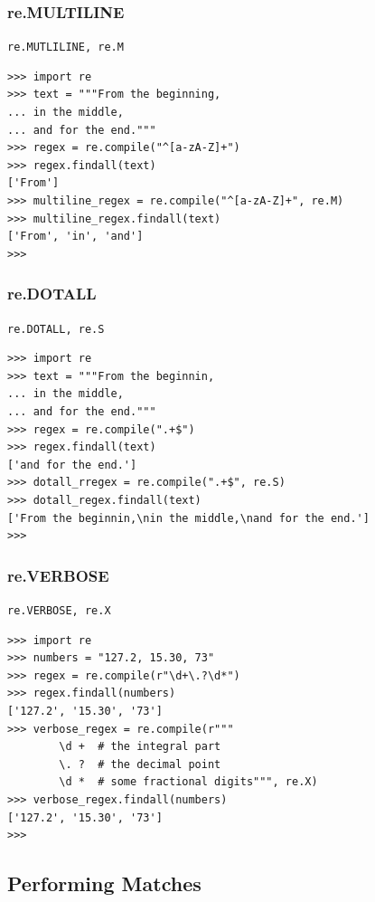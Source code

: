 \documentclass{beamer}
\begin{document}
\subsubsection{re.MULTILINE}
\begin{frame}[fragile]
\verb/re.MUTLILINE, re.M/ \\
\begin{lstlisting}
>>> import re
>>> text = """From the beginning,
... in the middle,
... and for the end."""
>>> regex = re.compile("^[a-zA-Z]+")
>>> regex.findall(text)
['From']
>>> multiline_regex = re.compile("^[a-zA-Z]+", re.M)
>>> multiline_regex.findall(text)
['From', 'in', 'and']
>>>
\end{lstlisting}
\end{frame}

\subsubsection{re.DOTALL}
\begin{frame}[fragile]
\verb/re.DOTALL, re.S/ \\
\begin{lstlisting}
>>> import re
>>> text = """From the beginnin,
... in the middle,
... and for the end."""
>>> regex = re.compile(".+$")
>>> regex.findall(text)
['and for the end.']
>>> dotall_rregex = re.compile(".+$", re.S)
>>> dotall_regex.findall(text)
['From the beginnin,\nin the middle,\nand for the end.']
>>>
\end{lstlisting}
\end{frame}

\subsubsection{re.VERBOSE}
\begin{frame}[fragile]
\verb/re.VERBOSE, re.X/ \\
\begin{lstlisting}
>>> import re
>>> numbers = "127.2, 15.30, 73"
>>> regex = re.compile(r"\d+\.?\d*")
>>> regex.findall(numbers)
['127.2', '15.30', '73']
>>> verbose_regex = re.compile(r"""
        \d +  # the integral part
        \. ?  # the decimal point
        \d *  # some fractional digits""", re.X)
>>> verbose_regex.findall(numbers)
['127.2', '15.30', '73']
>>>
\end{lstlisting}
\end{frame}

\subsection{Performing Matches}
\begin{frame}[fragile]
\end{frame}
\end{document}
